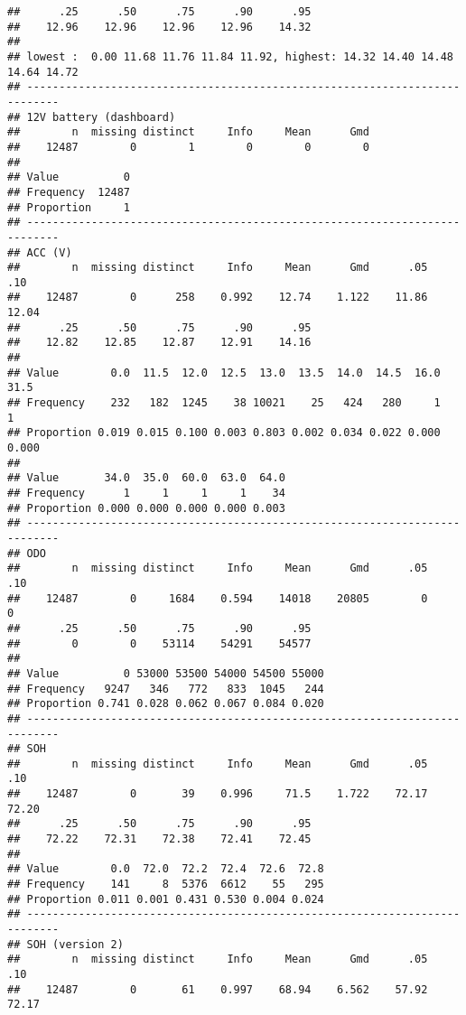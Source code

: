 \documentclass[]{article}
\begin{document}
\begin{verbatim}
##      .25      .50      .75      .90      .95 
##    12.96    12.96    12.96    12.96    14.32 
## 
## lowest :  0.00 11.68 11.76 11.84 11.92, highest: 14.32 14.40 14.48 14.64 14.72
## ---------------------------------------------------------------------------
## 12V battery (dashboard) 
##        n  missing distinct     Info     Mean      Gmd 
##    12487        0        1        0        0        0 
##                 
## Value          0
## Frequency  12487
## Proportion     1
## ---------------------------------------------------------------------------
## ACC (V) 
##        n  missing distinct     Info     Mean      Gmd      .05      .10 
##    12487        0      258    0.992    12.74    1.122    11.86    12.04 
##      .25      .50      .75      .90      .95 
##    12.82    12.85    12.87    12.91    14.16 
##                                                                       
## Value        0.0  11.5  12.0  12.5  13.0  13.5  14.0  14.5  16.0  31.5
## Frequency    232   182  1245    38 10021    25   424   280     1     1
## Proportion 0.019 0.015 0.100 0.003 0.803 0.002 0.034 0.022 0.000 0.000
##                                         
## Value       34.0  35.0  60.0  63.0  64.0
## Frequency      1     1     1     1    34
## Proportion 0.000 0.000 0.000 0.000 0.003
## ---------------------------------------------------------------------------
## ODO 
##        n  missing distinct     Info     Mean      Gmd      .05      .10 
##    12487        0     1684    0.594    14018    20805        0        0 
##      .25      .50      .75      .90      .95 
##        0        0    53114    54291    54577 
##                                               
## Value          0 53000 53500 54000 54500 55000
## Frequency   9247   346   772   833  1045   244
## Proportion 0.741 0.028 0.062 0.067 0.084 0.020
## ---------------------------------------------------------------------------
## SOH 
##        n  missing distinct     Info     Mean      Gmd      .05      .10 
##    12487        0       39    0.996     71.5    1.722    72.17    72.20 
##      .25      .50      .75      .90      .95 
##    72.22    72.31    72.38    72.41    72.45 
##                                               
## Value        0.0  72.0  72.2  72.4  72.6  72.8
## Frequency    141     8  5376  6612    55   295
## Proportion 0.011 0.001 0.431 0.530 0.004 0.024
## ---------------------------------------------------------------------------
## SOH (version 2) 
##        n  missing distinct     Info     Mean      Gmd      .05      .10 
##    12487        0       61    0.997    68.94    6.562    57.92    72.17 

\end{verbatim}
\end{document}
